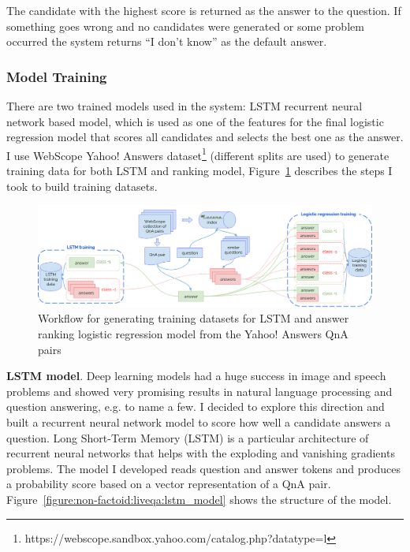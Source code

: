 The candidate with the highest score is returned as the answer to the question.
If something goes wrong and no candidates were generated or some problem occurred the system returns ``I don't know'' as the default answer.

\subsubsection{Model Training}
\label{section:non-factoid:liveqa:architecture:training}

There are two trained models used in the system: LSTM recurrent neural network based model, which is used as one of the features for the final logistic regression model that scores all candidates and selects the best one as the answer.
I use WebScope Yahoo! Answers dataset\footnote{https://webscope.sandbox.yahoo.com/catalog.php?datatype=l} (different splits are used) to generate training data for both LSTM and ranking model, Figure~\ref{figure:non-factoid:liveqa:model_training} describes the steps I took to build training datasets.

\begin{figure}
	\includegraphics[width=470px]{img/liveqa_model_training}
	\caption{Workflow for generating training datasets for LSTM and answer ranking logistic regression model from the Yahoo! Answers QnA pairs}
	\label{figure:non-factoid:liveqa:model_training}
\end{figure}

\textbf{LSTM model}.
Deep learning models had a huge success in image and speech problems and showed very promising results in natural language processing and question answering, e.g. \cite{yu2014deep,diwang_lstm_2015} to name a few.
I decided to explore this direction and built a recurrent neural network model to score how well a candidate answers a question.
Long Short-Term Memory (LSTM) \cite{hochreiter1997long} is a particular architecture of recurrent neural networks that helps with the exploding and vanishing gradients problems.
The model I developed reads question and answer tokens and produces a probability score based on a vector representation of a QnA pair.
Figure~\ref{figure:non-factoid:liveqa:lstm_model} shows the structure of the model.

